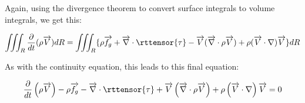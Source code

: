Again, using the divergence theorem to convert surface integrals to volume integrals, we get this:

\begin{equation}
  \iiint_R\frac{\partial}{dt}(\rho\overrightarrow{V})dR = \iiint_R\{\rho \overrightarrow{f_g} + \overrightarrow{\nabla}\cdot\rttensor{\tau} - \overrightarrow{V}(\overrightarrow{\nabla}\cdot \rho\overrightarrow{V}) + \rho(\overrightarrow{V}\cdot\nabla)\overrightarrow{V}\}dR
\end{equation}

As with the continuity equation, this leads to this final equation:

\begin{equation}
\frac{\partial}{dt}\left(\rho\overrightarrow{V}\right) 
  - \rho \overrightarrow{f_g} 
  - \overrightarrow{\nabla}\cdot\rttensor{\tau} 
  + \overrightarrow{V}\left(\overrightarrow{\nabla}\cdot \rho\overrightarrow{V}\right) 
  + \rho\left(\overrightarrow{V}\cdot\nabla\right)\overrightarrow{V} = 0
\end{equation}


